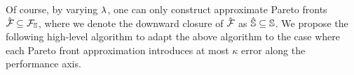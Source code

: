 Of course, by varying $\lambda$, one can only construct approximate
Pareto fronts $\hat{\mathcal{F}_{}} \subseteq \mathcal{F}_{\mathbb{S}}$, where we denote the downward closure of $\hat{\mathcal{F}_{}}$ as $\hat{\mathbb{S}} \subseteq \mathbb{S}$.
We propose the following high-level algorithm to adapt the above
algorithm to the case where each Pareto front approximation introduces at
most $\kappa$ error along the performance axis.
